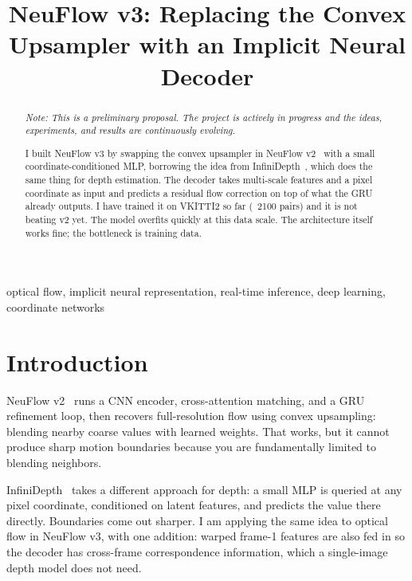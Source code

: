 \documentclass[conference]{IEEEtran}
\begin{document}
\title{NeuFlow v3: Replacing the Convex Upsampler with an Implicit Neural Decoder}

\author{
}

\maketitle

\begin{abstract}
\textit{Note: This is a preliminary proposal. The project is actively in progress and the ideas, experiments, and results are continuously evolving.}

I built NeuFlow v3 by swapping the convex upsampler in NeuFlow v2~\cite{neuflowv2} with a small coordinate-conditioned MLP, borrowing the idea from InfiniDepth~\cite{infidepth}, which does the same thing for depth estimation. The decoder takes multi-scale features and a pixel coordinate as input and predicts a residual flow correction on top of what the GRU already outputs. I have trained it on VKITTI2 so far (~2100 pairs) and it is not beating v2 yet. The model overfits quickly at this data scale. The architecture itself works fine; the bottleneck is training data.
\end{abstract}

\begin{IEEEkeywords}
optical flow, implicit neural representation, real-time inference, deep learning, coordinate networks
\end{IEEEkeywords}

\section{Introduction}

NeuFlow v2~\cite{neuflowv2} runs a CNN encoder, cross-attention matching, and a GRU refinement loop, then recovers full-resolution flow using convex upsampling: blending nearby coarse values with learned weights. That works, but it cannot produce sharp motion boundaries because you are fundamentally limited to blending neighbors.

InfiniDepth~\cite{infidepth} takes a different approach for depth: a small MLP is queried at any pixel coordinate, conditioned on latent features, and predicts the value there directly. Boundaries come out sharper. I am applying the same idea to optical flow in NeuFlow v3, with one addition: warped frame-1 features are also fed in so the decoder has cross-frame correspondence information, which a single-image depth model does not need.
\end{document}
